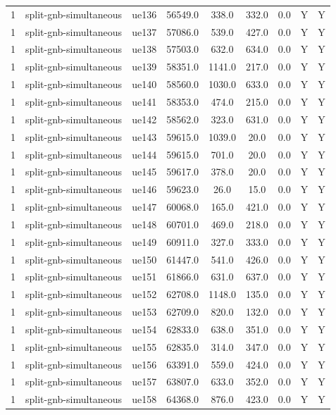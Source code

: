 \begin{table}[ht]
\begin{tabular}{|c|c|c|c|c|c|c|c|c|}
1 & split-gnb-simultaneous & ue136 & 56549.0 & 338.0 & 332.0 & 0.0 & Y & Y \\
1 & split-gnb-simultaneous & ue137 & 57086.0 & 539.0 & 427.0 & 0.0 & Y & Y \\
1 & split-gnb-simultaneous & ue138 & 57503.0 & 632.0 & 634.0 & 0.0 & Y & Y \\
1 & split-gnb-simultaneous & ue139 & 58351.0 & 1141.0 & 217.0 & 0.0 & Y & Y \\
1 & split-gnb-simultaneous & ue140 & 58560.0 & 1030.0 & 633.0 & 0.0 & Y & Y \\
1 & split-gnb-simultaneous & ue141 & 58353.0 & 474.0 & 215.0 & 0.0 & Y & Y \\
1 & split-gnb-simultaneous & ue142 & 58562.0 & 323.0 & 631.0 & 0.0 & Y & Y \\
1 & split-gnb-simultaneous & ue143 & 59615.0 & 1039.0 & 20.0 & 0.0 & Y & Y \\
1 & split-gnb-simultaneous & ue144 & 59615.0 & 701.0 & 20.0 & 0.0 & Y & Y \\
1 & split-gnb-simultaneous & ue145 & 59617.0 & 378.0 & 20.0 & 0.0 & Y & Y \\
1 & split-gnb-simultaneous & ue146 & 59623.0 & 26.0 & 15.0 & 0.0 & Y & Y \\
1 & split-gnb-simultaneous & ue147 & 60068.0 & 165.0 & 421.0 & 0.0 & Y & Y \\
1 & split-gnb-simultaneous & ue148 & 60701.0 & 469.0 & 218.0 & 0.0 & Y & Y \\
1 & split-gnb-simultaneous & ue149 & 60911.0 & 327.0 & 333.0 & 0.0 & Y & Y \\
1 & split-gnb-simultaneous & ue150 & 61447.0 & 541.0 & 426.0 & 0.0 & Y & Y \\
1 & split-gnb-simultaneous & ue151 & 61866.0 & 631.0 & 637.0 & 0.0 & Y & Y \\
1 & split-gnb-simultaneous & ue152 & 62708.0 & 1148.0 & 135.0 & 0.0 & Y & Y \\
1 & split-gnb-simultaneous & ue153 & 62709.0 & 820.0 & 132.0 & 0.0 & Y & Y \\
1 & split-gnb-simultaneous & ue154 & 62833.0 & 638.0 & 351.0 & 0.0 & Y & Y \\
1 & split-gnb-simultaneous & ue155 & 62835.0 & 314.0 & 347.0 & 0.0 & Y & Y \\
1 & split-gnb-simultaneous & ue156 & 63391.0 & 559.0 & 424.0 & 0.0 & Y & Y \\
1 & split-gnb-simultaneous & ue157 & 63807.0 & 633.0 & 352.0 & 0.0 & Y & Y \\
1 & split-gnb-simultaneous & ue158 & 64368.0 & 876.0 & 423.0 & 0.0 & Y & Y \\

\end{tabular}
\end{table}
